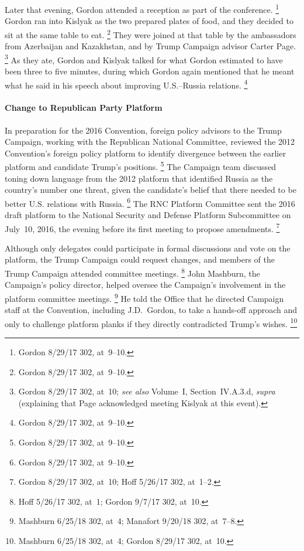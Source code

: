 Later that evening, Gordon attended a reception as part of the conference.%
\footnote{Gordon 8/29/17 302, at~9--10.}
Gordon ran into Kislyak as the two prepared plates of food, and they decided to sit at the same table to eat.%
\footnote{Gordon 8/29/17 302, at~9--10.}
They were joined at that table by the ambassadors from Azerbaijan and Kazakhstan, and by Trump Campaign advisor Carter Page.%
\footnote{Gordon 8/29/17 302, at~10;
\textit{see also} Volume~I, Section~IV.A.3.d, \textit{supra} (explaining that Page acknowledged meeting Kislyak at this event).
}
As they ate, Gordon and Kislyak talked for what Gordon estimated to have been three to five minutes, during which Gordon again mentioned that he meant what he said in his speech about improving U.S.--Russia relations.%
\footnote{Gordon 8/29/17 302, at~9--10.}

\paragraph{Change to Republican Party Platform}

In preparation for the 2016 Convention, foreign policy advisors to the Trump Campaign, working with the Republican National Committee, reviewed the 2012 Convention's foreign policy platform to identify divergence between the earlier platform and candidate Trump's positions.%
\footnote{Gordon 8/29/17 302, at~9--10.}
The Campaign team discussed toning down language from the 2012 platform that identified Russia as the country's number one threat, given the candidate's belief that there needed to be better U.S. relations with Russia.%
\footnote{Gordon 8/29/17 302, at~9--10.}
The RNC Platform Committee sent the 2016 draft platform to the National Security and Defense Platform Subcommittee on July~10, 2016, the evening before its first meeting to propose amendments.%
\footnote{Gordon 8/29/17 302, at~10;
Hoff 5/26/17 302, at~1--2.}

Although only delegates could participate in formal discussions and vote on the platform, the Trump Campaign could request changes, and members of the Trump Campaign attended committee meetings.%
\footnote{Hoff 5/26/17 302, at~1;
Gordon 9/7/17 302, at~10.}
John Mashburn, the Campaign's policy director, helped oversee the Campaign's involvement in the platform committee meetings.%
\footnote{Mashburn 6/25/18 302, at~4;
Manafort 9/20/18 302, at~7--8.}
He told the Office that he directed Campaign staff at the Convention, including J.D.~Gordon, to take a hands-off approach and only to challenge platform planks if they directly contradicted Trump's wishes.%
\footnote{Mashburn 6/25/18 302, at~4;
Gordon 8/29/17 302, at~10.}

